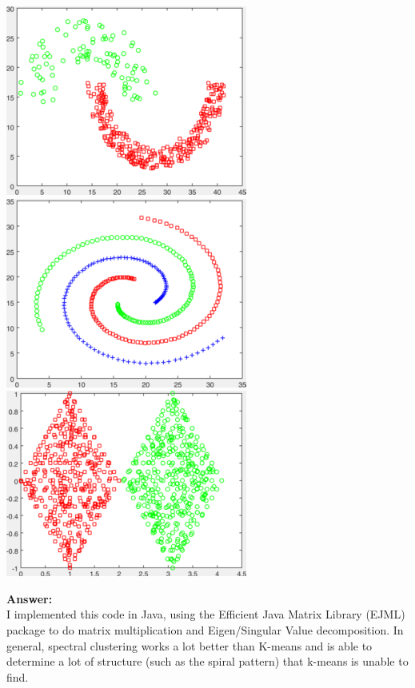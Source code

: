 \documentclass[11pt]{article}
\begin{document}
\begin{center}
\includegraphics[scale=0.5]{jain}
\includegraphics[scale=0.5]{spiral}
\includegraphics[scale=0.5]{twoDiamonds}
\end{center}
\pagebreak
{\bf Answer:}\\[5pt] 
I implemented this code in Java, using the Efficient Java Matrix Library (EJML) package to do matrix multiplication and Eigen/Singular Value decomposition. In general, spectral clustering works a lot better than K-means and is able to determine a lot of structure (such as the spiral pattern) that k-means is unable to find. 
\end{document}

